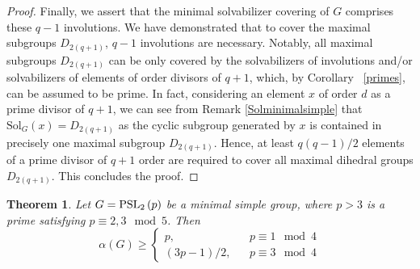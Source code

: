 \documentclass{amsart}
\newcommand{\Solv}{\text{Sol}}
\newtheorem{theorem}{Theorem}[section]
\theoremstyle{definition}
\theoremstyle{remark}
\begin{document}
\begin{proof}
Finally, we assert that the minimal solvabilizer covering of $G$ comprises these $q-1$ involutions. We have demonstrated that to cover the maximal subgroups $D_{2(q+1)}$, $q-1$ involutions are necessary. Notably, all maximal subgroups $D_{2(q+1)}$ can be only covered by the solvabilizers of involutions and/or solvabilizers of elements of order divisors of $q+1$, which, by Corollary ~\ref{primes}, can be assumed to be prime. In fact, considering an element $x$ of order $d$ as a prime divisor of $q+1$, we can see from Remark \ref{Solminimalsimple} that
$\Solv_G(x)=D_{2(q+1)}$ as the cyclic subgroup generated by $x$ is contained in precisely one maximal subgroup $D_{2(q+1)}$. Hence, at least $q(q-1)/2$ elements of a prime divisor of $q+1$ order are required to cover all maximal dihedral groups $D_{2(q+1)}$. This concludes the proof.
\end{proof}
\begin{theorem}\label{PSL(2, q)}
Let $G=\operatorname{PSL}_{2}\left(p\right)$ be a minimal simple group, where $p>3$ is a prime satisfying $p \equiv 2,3 \mod 5$. Then $$\alpha(G)\geq\left \{\begin{array}{lll}
p, &  & p \equiv 1 \mod 4 \\[0.1cm]
(3p-1)/2, & & p \equiv 3 \mod 4 \end{array} \right. $$
\end{theorem}
\end{document}
